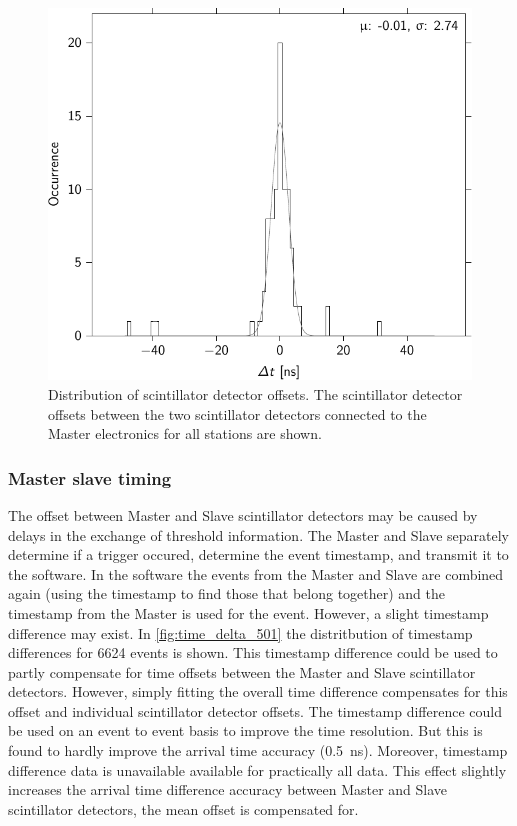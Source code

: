 \begin{figure}
    \centering
    \includegraphics{plots/station/detector_offset_distribution}
    \caption{Distribution of scintillator detector offsets. The scintillator detector offsets between the two scintillator detectors connected to the Master electronics for all \hisparc stations are shown.}
    \label{fig:detector_offset_distribution}
\end{figure}


\subsubsection{Master slave timing}
\label{sec:masterslavetiming}

The offset between Master and Slave scintillator detectors may be caused by delays in the exchange of threshold information. The Master and Slave separately determine if a trigger occured, determine the event timestamp, and  transmit it to the \daq software. In the \daq software the events from the Master and Slave are combined again (using the timestamp to find those that belong together) and the timestamp from the Master is used for the event. However, a slight timestamp difference may exist. In \cref{fig:time_delta_501} the distritbution of timestamp differences for \num{6624} events is shown. This timestamp difference could be used to partly compensate for time offsets between the Master and Slave scintillator detectors. However, simply fitting the overall time difference compensates for this offset and individual scintillator detector offsets. The timestamp difference could be used on an event to event basis to improve the time resolution. But this is found to hardly improve the arrival time accuracy (\SI{0.5}{\ns}). Moreover, timestamp difference data is unavailable available for practically all \hisparc data. This effect slightly increases the arrival time difference accuracy between Master and Slave scintillator detectors, the mean offset is compensated for.

